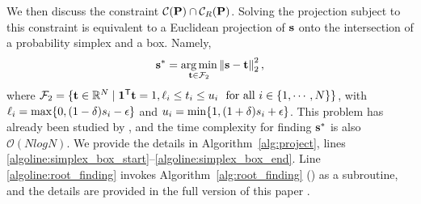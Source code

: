 \documentclass[sigconf, anonymous, review]{acmart}
\begin{document}


We then discuss the constraint $\mathcal{C}(\mathbf{{P}}) \cap \mathcal{C}_R(\mathbf{{P}})$. Solving the projection subject to this constraint is equivalent to  a Euclidean projection of $\mathbf{{s}}$ onto the intersection of a probability simplex and a box. Namely,
\begin{equation*}
\label{eq:projection_simplex_plus_box}
	\mathbf{{s}}^{*}  =\underset {\mathbf{{t}} \in  \mathcal{F}_2}{\arg\min} \left\| \mathbf{{s}} - \mathbf{{t}} \right\|_2^2,
\end{equation*}
where $\mathcal{F}_2 = \{ \vectt \in \mathbb{R}^{N} \mid \mathbf{1}^{\mathsf{T}} \vectt = 1,  \lbound_i \leq t_i \leq \ubound_i \ \text{ for all } i \in \{1, \cdots, N\}\}$, with $\ell_i = \max \{0, (1 - \delta) s_i - \epsilon \}$ and $u_i = \min \{1, (1 + \delta) s_i + \epsilon \}$. This problem has already been studied by \citet{adam2022projections}, and the time complexity for finding $\mathbf{{s}}^{*}$ is also $\mathcal{O}(NlogN)$.
We provide the details in Algorithm~\ref{alg:project}, lines \ref{algoline:simplex_box_start}--\ref{algoline:simplex_box_end}. Line \ref{algoline:root_finding} invokes Algorithm~\ref{alg:root_finding} (\searchlambda) as a subroutine, and the details are provided in the full version of this paper
\citep[]{fullversion}.
\end{document}
